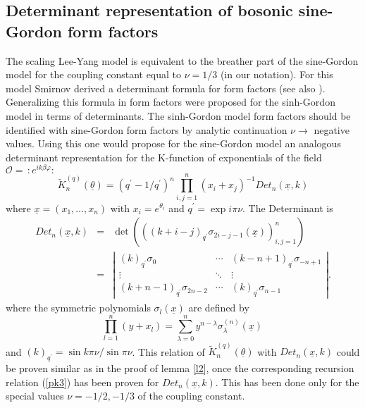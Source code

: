 \documentclass[a4paper,a4paper]{article}
\begin{document}
\subsection{Determinant representation of bosonic sine-Gordon form factors}

The scaling Lee-Yang model is equivalent to the breather part of the
sine-Gordon model for the coupling constant equal to $\nu =1/3$ (in our
notation). For this model Smirnov \cite{Sm1} derived a determinant formula
for form factors (see also \cite{AlZa1}). Generalizing this formula in \cite
{FMS,KM} form factors were proposed for the sinh-Gordon model in terms of
determinants. The sinh-Gordon model form factors should be identified with
sine-Gordon form factors by analytic continuation $\nu \rightarrow $
negative values. Using this one would propose for the sine-Gordon model an
analogous determinant representation for the K-function of exponentials of
the field $\mathcal{O}=\,:e^{ik\beta \varphi }:$ 
\[
\tilde{K}_{n}^{(q)}(\underline{\theta })=\left( q^{\prime }-1/q^{\prime
}\right) ^{n}\prod_{i,j=1}^{n}(x_{i}+x_{j})^{-1}Det_{n}(\underline{x},k) 
\]
where $\underline{x}=(x_{1},\dots ,x_{n})$ with $x_{i}=e^{\theta _{i}}$ and $%
q^{\prime }=\exp i\pi \nu $. The Determinant is 
\begin{eqnarray*}
Det_{n}(\underline{x},k) &=&\det \left( \left( \left( k+i-j\right)
_{q^{\prime }}\sigma _{2i-j-1}(\underline{x})\right) _{i,j=1}^{n}\right) \\
&=&\left| 
\begin{array}{ccc}
\left( k\right) _{q^{\prime }}\sigma _{0} & \cdots & \left( k-n+1\right)
_{q^{\prime }}\sigma _{-n+1} \\ 
\vdots & \ddots & \vdots \\ 
\left( k+n-1\right) _{q^{\prime }}\sigma _{2n-2} & \cdots & \left( k\right)
_{q^{\prime }}\sigma _{n-1}
\end{array}
\right| .
\end{eqnarray*}
where the symmetric polynomials $\sigma _{l}(\underline{x})$ are defined by 
\[
\prod_{l=1}^{n}(y+x_{l})=\sum_{\lambda =0}^{n}y^{n-\lambda }\sigma _{\lambda
}^{(n)}(\underline{x})\, 
\]
and $\left( k\right) _{q^{\prime }}=\sin k\pi \nu /\sin \pi \nu $. This
relation of $\tilde{K}_{n}^{(q)}(\underline{\theta })$ with $Det_{n}(%
\underline{x},k)$ could be proven similar as in the proof of lemma \ref{l2},
once the corresponding recursion relation (\ref{pk3}) has been proven for $%
Det_{n}(\underline{x},k)$. This has been done \cite{FMS} only for the
special values $\nu =-1/2,-1/3$ of the coupling constant.
\end{document}
